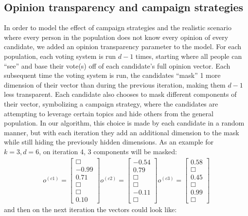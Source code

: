 \subsection{Opinion transparency and campaign strategies}
In order to model the effect of campaign strategies and the realistic scenario where every person in the population does not know every opinion of every candidate, we added an opinion transparency parameter to the model.
For each population, each voting system is run $d-1$ times, starting where all people can ``see'' and base their vote(s) off of each candidate's full opinion vector.
Each subsequent time the voting system is run, the candidates ``mask'' 1 more dimension of their vector than during the previous iteration, making them $d-1$ less transparent.
Each candidate also chooses to mask different components of their vector, symbolizing a campaign strategy, where the candidates are attempting to leverage certain topics and hide others from the general population.
In our algorithm, this choice is made by each candidate in a random manner, but with each iteration they add an additional dimension to the mask while still hiding the previously hidden dimensions.
As an example for $k = 3, d = 6$, on iteration 4, 3 components will be masked:
\begin{align*}
o^{(c1)} = \begin{bmatrix}\Box \\ -0.99 \\ 0.71 \\ \Box \\ \Box \\ 0.10  \end{bmatrix}
o^{(c2)} = \begin{bmatrix}-0.54 \\ 0.79 \\ \Box \\ \Box \\ -0.11\\ \Box  \end{bmatrix}
o^{(c3)} = \begin{bmatrix}0.58 \\ \Box \\ 0.45 \\ \Box \\ 0.99 \\ \Box  \end{bmatrix}
\end{align*}
and then on the next iteration the vectors could look like:
